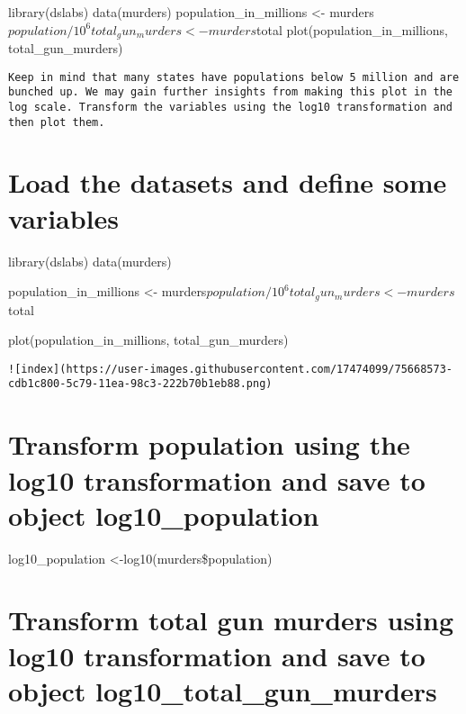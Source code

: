 \documentclass[
]{article}
\begin{document}
library(dslabs) data(murders) population\_in\_millions \textless-
murders\(population/10^6 total_gun_murders <− murders\)total
plot(population\_in\_millions, total\_gun\_murders)

\begin{verbatim}
Keep in mind that many states have populations below 5 million and are bunched up. We may gain further insights from making this plot in the log scale. Transform the variables using the log10 transformation and then plot them.
\end{verbatim}

\hypertarget{load-the-datasets-and-define-some-variables}{%
\section{Load the datasets and define some
variables}\label{load-the-datasets-and-define-some-variables}}

library(dslabs) data(murders)

population\_in\_millions \textless-
murders\(population/10^6 total_gun_murders <- murders\)total

plot(population\_in\_millions, total\_gun\_murders)

\begin{verbatim}
![index](https://user-images.githubusercontent.com/17474099/75668573-cdb1c800-5c79-11ea-98c3-222b70b1eb88.png)
\end{verbatim}

\hypertarget{transform-population-using-the-log10-transformation-and-save-to-object-log10_population}{%
\section{Transform population using the log10 transformation and save to
object
log10\_population}\label{transform-population-using-the-log10-transformation-and-save-to-object-log10_population}}

log10\_population \textless-log10(murders\$population)

\hypertarget{transform-total-gun-murders-using-log10-transformation-and-save-to-object-log10_total_gun_murders}{%
\section{Transform total gun murders using log10 transformation and save
to object
log10\_total\_gun\_murders}\label{transform-total-gun-murders-using-log10-transformation-and-save-to-object-log10_total_gun_murders}}
\end{document}
